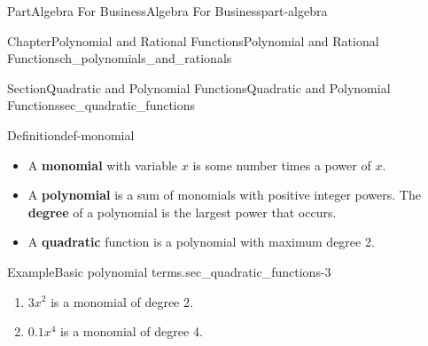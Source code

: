 \documentclass[oneside,10pt,]{tufte-book}
\newcommand{\terminology}[1]{\textbf{#1}}
\numberwithin{equation}{chapter}
\begin{document}
\begin{partptx}{Part}{Algebra For Business}{}{Algebra For Business}{}{}{part-algebra}
\begin{chapterptx}{Chapter}{Polynomial and Rational Functions}{}{Polynomial and Rational Functions}{}{}{ch_polynomials_and_rationals}
\begin{introduction}{}
\begin{image}{0}{1}{0}{}
{
}%
\end{image}%
\end{introduction}%
%
%
\typeout{************************************************}
\typeout{************************************************}
%
\begin{sectionptx}{Section}{Quadratic and Polynomial Functions}{}{Quadratic and Polynomial Functions}{}{}{sec_quadratic_functions}
\begin{definition}{Definition}{}{def-monomial}%
%
\begin{itemize}[label=\textbullet]
\item{}A \terminology{monomial} with variable \(x\) is some number times a power of \(x\).%
\item{}A \terminology{polynomial} is a sum of monomials with positive integer powers.  The \terminology{degree} of a polynomial is the largest power that occurs.%
\item{}A \terminology{quadratic} function is a polynomial with maximum degree 2.%
\end{itemize}
%
\end{definition}
\begin{example}{Example}{Basic polynomial terms.}{sec_quadratic_functions-3}%
%
\begin{enumerate}
\item{}\(3x^2\) is a monomial of degree 2.%
\item{}\(0.1 x^4\) is a monomial of degree 4.%

\end{enumerate}
\end{example}
\end{sectionptx}
\end{chapterptx}
\end{partptx}
\end{document}
